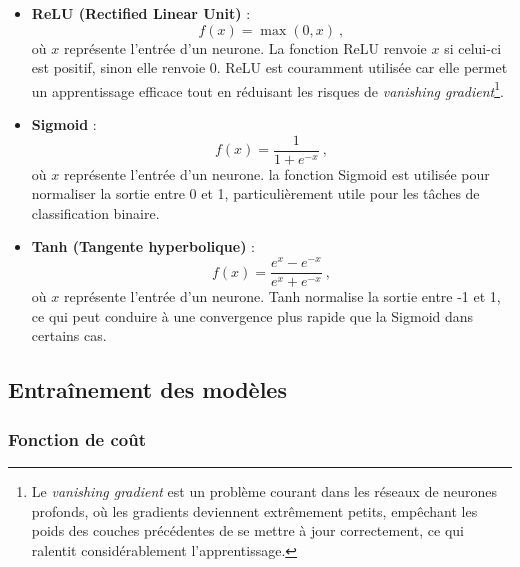 \begin{itemize}
	\item \textbf{ReLU (Rectified Linear Unit)} : 
	\[
	f(x) = \max(0, x)~,
	\]
	où $x$ représente l'entrée d'un neurone. La fonction ReLU renvoie $x$ si celui-ci est positif, sinon elle renvoie $0$. ReLU est couramment utilisée car elle permet un apprentissage efficace tout en réduisant les risques de \textit{vanishing gradient}\footnote{Le \textit{vanishing gradient} est un problème courant dans les réseaux de neurones profonds, où les gradients deviennent extrêmement petits, empêchant les poids des couches précédentes de se mettre à jour correctement, ce qui ralentit considérablement l'apprentissage.}.

	\item \textbf{Sigmoid} : 
	\[
	f(x) = \frac{1}{1 + e^{-x}}~,
	\]
	où $x$ représente l'entrée d'un neurone. la fonction Sigmoid est utilisée pour normaliser la sortie entre 0 et 1, particulièrement utile pour les tâches de classification binaire.
	\item \textbf{Tanh (Tangente hyperbolique)} : 
	\[
	f(x) = \frac{e^x - e^{-x}}{e^x + e^{-x}}~,
	\]
	où $x$ représente l'entrée d'un neurone. Tanh normalise la sortie entre -1 et 1, ce qui peut conduire à une convergence plus rapide que la Sigmoid dans certains cas.
\end{itemize}

\subsection{Entraînement des modèles}

\subsubsection{Fonction de coût}


